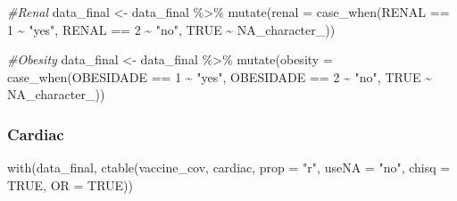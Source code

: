 \documentclass[
]{article}
\newenvironment{Shaded}{\begin{snugshade}}{\end{snugshade}}
\newcommand{\AttributeTok}[1]{\textcolor[rgb]{0.77,0.63,0.00}{#1}}
\newcommand{\CommentTok}[1]{\textcolor[rgb]{0.56,0.35,0.01}{\textit{#1}}}
\newcommand{\ConstantTok}[1]{\textcolor[rgb]{0.00,0.00,0.00}{#1}}
\newcommand{\DecValTok}[1]{\textcolor[rgb]{0.00,0.00,0.81}{#1}}
\newcommand{\FunctionTok}[1]{\textcolor[rgb]{0.00,0.00,0.00}{#1}}
\newcommand{\NormalTok}[1]{#1}
\newcommand{\OtherTok}[1]{\textcolor[rgb]{0.56,0.35,0.01}{#1}}
\newcommand{\SpecialCharTok}[1]{\textcolor[rgb]{0.00,0.00,0.00}{#1}}
\newcommand{\StringTok}[1]{\textcolor[rgb]{0.31,0.60,0.02}{#1}}
\begin{document}
\begin{Shaded}
\begin{Highlighting}[]
\CommentTok{\#Renal}
\NormalTok{data\_final }\OtherTok{\textless{}{-}}\NormalTok{  data\_final }\SpecialCharTok{\%\textgreater{}\%}
  \FunctionTok{mutate}\NormalTok{(}\AttributeTok{renal =} \FunctionTok{case\_when}\NormalTok{(RENAL }\SpecialCharTok{==} \DecValTok{1} \SpecialCharTok{\textasciitilde{}} \StringTok{"yes"}\NormalTok{,}
\NormalTok{                           RENAL }\SpecialCharTok{==} \DecValTok{2} \SpecialCharTok{\textasciitilde{}} \StringTok{"no"}\NormalTok{,}
                           \ConstantTok{TRUE} \SpecialCharTok{\textasciitilde{}} \ConstantTok{NA\_character\_}\NormalTok{))}

\CommentTok{\#Obesity}
\NormalTok{data\_final }\OtherTok{\textless{}{-}}\NormalTok{  data\_final }\SpecialCharTok{\%\textgreater{}\%}
  \FunctionTok{mutate}\NormalTok{(}\AttributeTok{obesity =} \FunctionTok{case\_when}\NormalTok{(OBESIDADE }\SpecialCharTok{==} \DecValTok{1} \SpecialCharTok{\textasciitilde{}} \StringTok{"yes"}\NormalTok{,}
\NormalTok{                             OBESIDADE }\SpecialCharTok{==} \DecValTok{2} \SpecialCharTok{\textasciitilde{}} \StringTok{"no"}\NormalTok{,}
                             \ConstantTok{TRUE} \SpecialCharTok{\textasciitilde{}} \ConstantTok{NA\_character\_}\NormalTok{))}
\end{Highlighting}
\end{Shaded}

\hypertarget{cardiac}{%
\subsubsection{Cardiac}\label{cardiac}}

\begin{Shaded}
\begin{Highlighting}[]
\FunctionTok{with}\NormalTok{(data\_final, }\FunctionTok{ctable}\NormalTok{(vaccine\_cov, cardiac, }\AttributeTok{prop =} \StringTok{"r"}\NormalTok{, }\AttributeTok{useNA =} \StringTok{"no"}\NormalTok{, }\AttributeTok{chisq =} \ConstantTok{TRUE}\NormalTok{, }\AttributeTok{OR =} \ConstantTok{TRUE}\NormalTok{))}
\end{Highlighting}
\end{Shaded}
\end{document}
